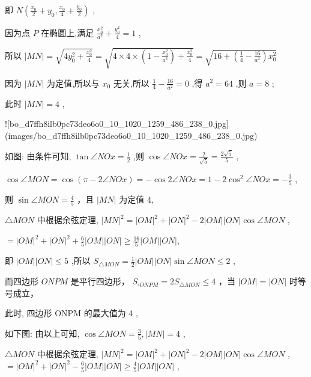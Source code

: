 \documentclass[10pt]{article}
\begin{document}
即 \(N\left( {\frac{{x}_{0}}{2} + {y}_{0},\frac{{x}_{0}}{4} + \frac{{y}_{0}}{2}}\right)\) ,

因为点 \(P\) 在椭圆上,满足 \(\frac{{x}_{0}^{2}}{{a}^{2}} + \frac{{y}_{0}^{2}}{4} = 1\) ,

所以 \(\left| {MN}\right|  = \sqrt{4{y}_{0}^{2} + \frac{{x}_{0}^{2}}{4}} = \sqrt{4 \times  4 \times  \left( {1 - \frac{{x}_{0}^{2}}{{a}^{2}}}\right)  + \frac{{x}_{0}^{2}}{4}} = \sqrt{{16} + \left( {\frac{1}{4} - \frac{16}{{a}^{2}}}\right) {x}_{0}^{2}}\)

因为 \(\left| {MN}\right|\) 为定值,所以与 \({x}_{0}\) 无关,所以 \(\frac{1}{4} - \frac{16}{{a}^{2}} = 0\) ,得 \({a}^{2} = {64}\) ,则 \(a = 8\) ;

此时 \(\left| {MN}\right|  = 4\) ,

![bo_d7ffh8ilb0pc73deo6o0_10_1020_1259_486_238_0.jpg](images/bo_d7ffh8ilb0pc73deo6o0_10_1020_1259_486_238_0.jpg)

如图: 由条件可知, \(\tan \angle {NOx} = \frac{1}{2}\) ,则 \(\cos \angle {NOx} = \frac{2}{\sqrt{5}} = \frac{2\sqrt{5}}{5}\) ,

\(\cos \angle {MON} = \cos \left( {\pi  - 2\angle {NOx}}\right)  =  - \cos 2\angle {NOx} = 1 - 2{\cos }^{2}\angle {NOx} =  - \frac{3}{5}\) ,

则 \(\sin \angle {MON} = \frac{4}{5}\) ，且 \(\left| {MN}\right|\) 为定值 4,

\(\bigtriangleup {MON}\) 中根据余弦定理, \({\left| MN\right| }^{2} = {\left| OM\right| }^{2} + {\left| ON\right| }^{2} - 2\left| {OM}\right| \left| {ON}\right| \cos \angle {MON}\) ,

\(= {\left| OM\right| }^{2} + {\left| ON\right| }^{2} + \frac{6}{5}\left| {OM}\right| \left| {ON}\right|  \geq  \frac{16}{5}\left| {OM}\right| \left| {ON}\right| ,\)

即 \(\left| {OM}\right| \left| {ON}\right|  \leq  5\) ,所以 \({S}_{\bigtriangleup {MON}} = \frac{1}{2}\left| {OM}\right| \left| {ON}\right| \sin \angle {MON} \leq  2\) ,

而四边形 \({ONPM}\) 是平行四边形， \({S}_{\square {ONPM}} = 2{S}_{\bigtriangleup {MON}} \leq  4\) ，当 \(\left| {OM}\right|  = \left| {ON}\right|\) 时等号成立，

此时, 四边形 ONPM 的最大值为 4 ,

如下图: 由以上可知, \(\cos \angle {MON} = \frac{3}{5},\left| {MN}\right|  = 4\) ,

\(\bigtriangleup {MON}\) 中根据余弦定理, \({\left| MN\right| }^{2} = {\left| OM\right| }^{2} + {\left| ON\right| }^{2} - 2\left| {OM}\right| \left| {ON}\right| \cos \angle {MON}\) , \(= {\left| OM\right| }^{2} + {\left| ON\right| }^{2} - \frac{6}{5}\left| {OM}\right| \left| {ON}\right|  \geq  \frac{4}{5}\left| {OM}\right| \left| {ON}\right|\) ,
\end{document}
